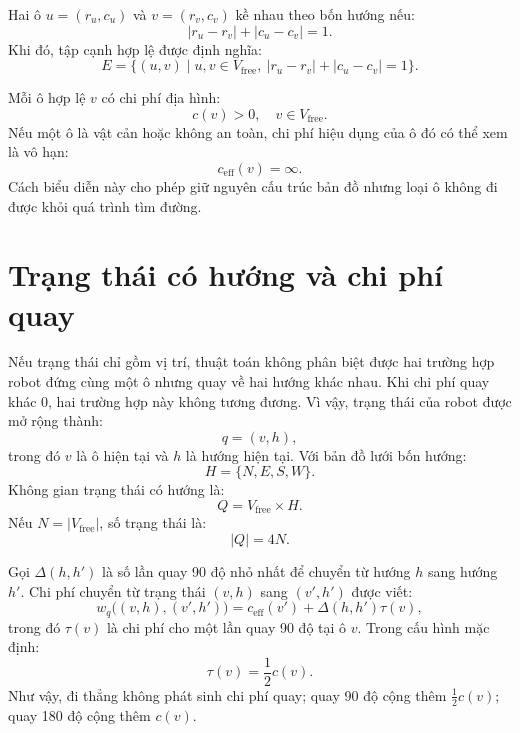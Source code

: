 \documentclass[../DoAn.tex]{subfiles}
\begin{document}
Hai ô $u=(r_u,c_u)$ và $v=(r_v,c_v)$ kề nhau theo bốn hướng nếu:
\begin{equation}
|r_u-r_v|+|c_u-c_v|=1.
\end{equation}
Khi đó, tập cạnh hợp lệ được định nghĩa:
\begin{equation}
E=\{(u,v)\mid u,v\in V_{\text{free}},\ |r_u-r_v|+|c_u-c_v|=1\}.
\end{equation}

Mỗi ô hợp lệ $v$ có chi phí địa hình:
\begin{equation}
c(v)>0,\quad v\in V_{\text{free}}.
\end{equation}
Nếu một ô là vật cản hoặc không an toàn, chi phí hiệu dụng của ô đó có thể xem là vô hạn:
\begin{equation}
c_{\text{eff}}(v)=\infty.
\end{equation}
Cách biểu diễn này cho phép giữ nguyên cấu trúc bản đồ nhưng loại ô không đi được khỏi quá trình tìm đường.

\section{Trạng thái có hướng và chi phí quay}

Nếu trạng thái chỉ gồm vị trí, thuật toán không phân biệt được hai trường hợp robot đứng cùng một ô nhưng quay về hai hướng khác nhau. Khi chi phí quay khác 0, hai trường hợp này không tương đương. Vì vậy, trạng thái của robot được mở rộng thành:
\begin{equation}
q=(v,h),
\end{equation}
trong đó $v$ là ô hiện tại và $h$ là hướng hiện tại. Với bản đồ lưới bốn hướng:
\begin{equation}
H=\{N,E,S,W\}.
\end{equation}
Không gian trạng thái có hướng là:
\begin{equation}
Q=V_{\text{free}}\times H.
\end{equation}
Nếu $N=|V_{\text{free}}|$, số trạng thái là:
\begin{equation}
|Q|=4N.
\end{equation}

Gọi $\Delta(h,h')$ là số lần quay 90 độ nhỏ nhất để chuyển từ hướng $h$ sang hướng $h'$. Chi phí chuyển từ trạng thái $(v,h)$ sang $(v',h')$ được viết:
\begin{equation}
w_q\bigl((v,h),(v',h')\bigr)=c_{\text{eff}}(v')+\Delta(h,h')\tau(v),
\end{equation}
trong đó $\tau(v)$ là chi phí cho một lần quay 90 độ tại ô $v$. Trong cấu hình mặc định:
\begin{equation}
\tau(v)=\frac{1}{2}c(v).
\end{equation}
Như vậy, đi thẳng không phát sinh chi phí quay; quay 90 độ cộng thêm $\frac{1}{2}c(v)$; quay 180 độ cộng thêm $c(v)$.
\end{document}
